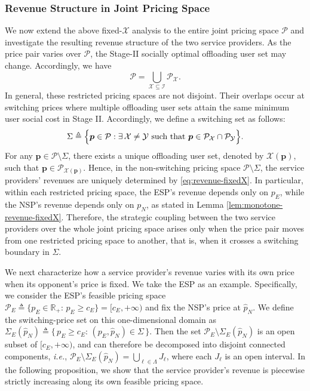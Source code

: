 \documentclass[lettersize,journal]{IEEEtran}
\newcommand{\ie}{\emph{i.e.}}
\begin{document}
\subsubsection{Revenue Structure in Joint Pricing Space}
We now extend the above fixed-$\mathcal{X}$ analysis to the entire joint pricing space $\mathcal{P}$ and investigate the resulting revenue structure of the two service providers. As the price pair varies over $\mathcal{P}$, the Stage-II socially optimal offloading user set may change. Accordingly, we have
\[
\mathcal{P}=\bigcup_{\mathcal{X}\subseteq\mathcal{I}} \mathcal{P}_{\mathcal{X}}.
\]
In general, these restricted pricing spaces are not disjoint. Their overlaps occur at switching prices where multiple offloading user sets attain the same minimum user social cost in Stage II. Accordingly, we define a switching set as follows:
\begin{equation}\label{eq:switching-set}
\Sigma
\triangleq
\Bigl\{
\boldsymbol{p}\in\mathcal{P}:
\exists\,\mathcal{X}\neq\mathcal{Y}
\text{ such that }
\boldsymbol{p}\in \mathcal{P}_{\mathcal{X}}\cap\mathcal{P}_{\mathcal{Y}}
\Bigr\}.
\end{equation}
For any $\boldsymbol{p}\in\mathcal{P}\setminus\Sigma$, there exists a unique offloading user set, denoted by $\mathcal{X}(\boldsymbol{p})$, such that
$\boldsymbol{p}\in\mathcal{P}_{\mathcal{X}(\boldsymbol{p})}$.
Hence, in the non-switching pricing space $\mathcal{P}\setminus\Sigma$, the service providers' revenues are uniquely determined by \eqref{eq:revenue-fixedX}. In particular, within each restricted pricing space, the ESP's revenue depends only on $p_E$, while the NSP's revenue depends only on $p_N$, as stated in Lemma \ref{lem:monotone-revenue-fixedX}. Therefore, the strategic coupling between the two service providers over the whole joint pricing space arises only when the price pair moves from one restricted pricing space to another, that is, when it crosses a switching boundary in $\Sigma$.

We next characterize how a service provider's revenue varies with its own price when its opponent's price is fixed. We take the ESP as an example. Specifically, we consider the ESP's feasible pricing space $\mathcal{P}_E\triangleq\{p_E\in\mathbb{R}_+:\, p_E\ge c_E\}=[c_E,+\infty)$ and fix the NSP's price at $\hat{p}_N$. We define the switching-price set on this one-dimensional domain as
\(
\Sigma_E(\hat{p}_N)
\triangleq
\{\,p_E\ge c_E:\,(p_E,\hat{p}_N)\in\Sigma\,\}.
\)
Then the set $\mathcal{P}_E\setminus \Sigma_E(\hat{p}_N)$ is an open subset of $[c_E,+\infty)$, and can therefore be decomposed into disjoint connected components, \ie, $\mathcal{P}_E\setminus \Sigma_E(\hat{p}_N)=\bigcup_{\ell\in\Lambda} J_\ell$, where each $J_\ell$ is an open interval.
In the following proposition, we show that the service provider's revenue is piecewise strictly increasing along its own feasible pricing space.
\end{document}
